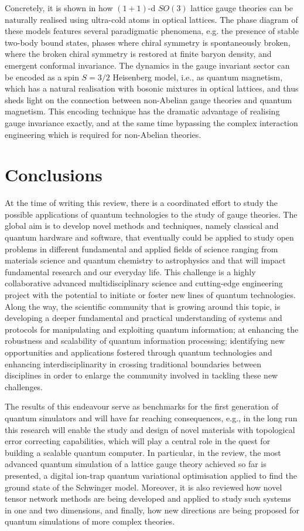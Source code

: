 \documentclass[epj,final]{svjour}
\begin{document}
Concretely, it is shown in \cite{rico2018so} how $(1+1)$-d $SO(3)$ lattice gauge theories can be naturally realised using ultra-cold atoms in optical lattices. The phase diagram of these models features several paradigmatic phenomena, e.g. the presence of stable two-body bound states, phases where chiral symmetry is spontaneously broken, where the broken chiral symmetry is restored at finite baryon density, and emergent conformal invariance.  The dynamics in the gauge invariant sector can be encoded as a spin $S=3/2$ Heisenberg model, i.e., as quantum magnetism, which has a natural realisation with bosonic mixtures in optical lattices, and thus sheds light on the connection between non-Abelian gauge theories and quantum magnetism. This encoding technique has the dramatic advantage of realising gauge invariance exactly, and at the same time bypassing the complex interaction engineering which is required for non-Abelian theories. 

\section{Conclusions}

At the time of writing this review, there is a coordinated effort to study the possible applications of quantum technologies to the study of gauge theories. The global aim is to develop novel methods and techniques, namely classical and quantum hardware and software, that eventually could be applied to study open problems in different fundamental and applied fields of science ranging from materials science and quantum chemistry to astrophysics and that will impact fundamental research and our everyday life. This challenge is a highly collaborative advanced multidisciplinary science and cutting-edge engineering project with the potential to initiate or foster new lines of quantum technologies. Along the way, the scientific community that is growing around this topic, is developing a deeper fundamental and practical understanding of systems and protocols for manipulating and exploiting quantum information; at enhancing the robustness and scalability of quantum information processing; identifying new opportunities and applications fostered through quantum technologies and enhancing interdisciplinarity in crossing traditional boundaries between disciplines in order to enlarge the community involved in tackling these new challenges.

The results of this endeavour serve as benchmarks for the first generation of quantum simulators and will have far reaching consequences, e.g., in the long run this research will enable the study and design of novel materials with topological error correcting capabilities, which will play a central role in the quest for building a scalable quantum computer. In particular, in the review, the most advanced quantum simulation of a lattice gauge theory achieved so far is presented, a digital ion-trap quantum variational optimisation applied to find the ground state of the Schwinger model. Moreover, it is also reviewed how novel tensor network methods are being developed and applied to study such systems in one and two dimensions, and finally, how new directions are being proposed for quantum simulations of more complex theories.
\end{document}
